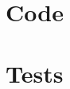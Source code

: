 \documentclass{article}
\title{
\vspace{2in}
\textmd{\textbf{\hmwkClass}}\\
\normalsize\vspace{0.1in}\small{\hmwkDueDate}\\
\vspace{0.1in}\large{\textit{\hmwkClassInstructor\ \hmwkClassTime}}
\vspace{3in}
}
\author{\hmwkAuthorName}
\date{} %
\begin{document}
\maketitle
\newpage

\section{Code}




\section{Tests}


\end{document}
